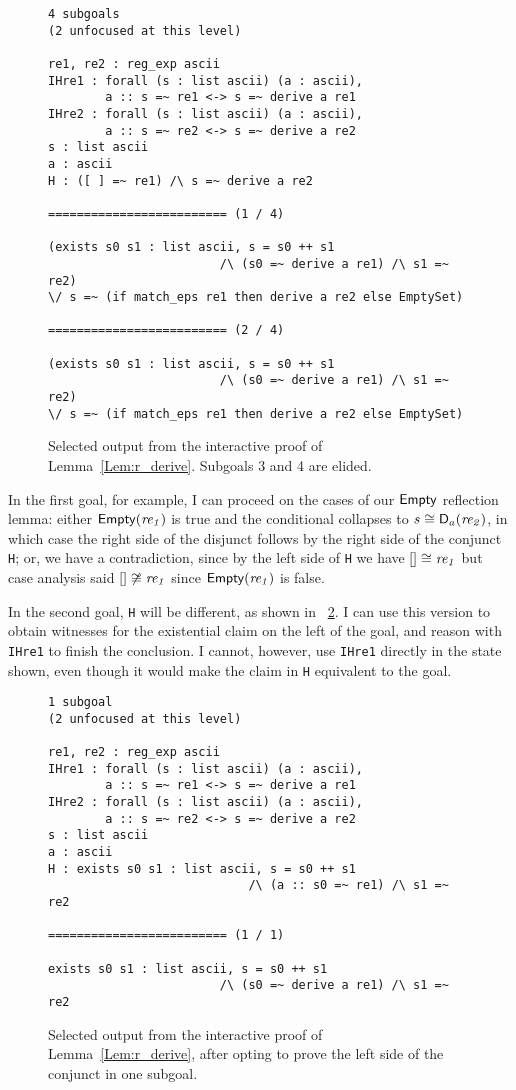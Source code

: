 \begin{figure}
\begin{verbatim}
4 subgoals
(2 unfocused at this level)

re1, re2 : reg_exp ascii
IHre1 : forall (s : list ascii) (a : ascii),
        a :: s =~ re1 <-> s =~ derive a re1
IHre2 : forall (s : list ascii) (a : ascii),
        a :: s =~ re2 <-> s =~ derive a re2
s : list ascii
a : ascii
H : ([ ] =~ re1) /\ s =~ derive a re2

========================= (1 / 4)

(exists s0 s1 : list ascii, s = s0 ++ s1
                        /\ (s0 =~ derive a re1) /\ s1 =~ re2)
\/ s =~ (if match_eps re1 then derive a re2 else EmptySet)

========================= (2 / 4)

(exists s0 s1 : list ascii, s = s0 ++ s1
                        /\ (s0 =~ derive a re1) /\ s1 =~ re2)
\/ s =~ (if match_eps re1 then derive a re2 else EmptySet)
\end{verbatim}
    \caption{Selected output from the interactive proof of
    Lemma~\ref{Lem:r_derive}. Subgoals 3 and 4 are elided.}\label{F:r_derive}
\end{figure}

In the first goal, for example, I can proceed on the cases of our
\(\mathsf{Empty}\) reflection lemma: either \(\mathsf{Empty}(\mathit{re_1})\) is true
and the conditional collapses to \(s \mathrel{\cong} \mathsf{D}_a(\mathit{re_2})\), in which
case the right side of the disjunct follows by the right side of the conjunct
\texttt{H}; or, we have a contradiction, since by the left side of \texttt{H} we have \([]
\mathrel{\cong} \mathit{re_1}\) but case analysis said \([] \not\mathrel{\cong} \mathit{re_1}\)
since \(\mathsf{Empty}(\mathit{re_1})\) is false.

In the second goal, \texttt{H} will be different, as shown in
\figurename~\ref{F:r_derive2}. I can use this version to obtain witnesses for
the existential claim on the left of the goal, and reason with \texttt{IHre1} to
finish the conclusion. I cannot, however, use \texttt{IHre1} directly in the
state shown, even though it would make the claim in \texttt{H} equivalent to the
goal.

\begin{figure}
\begin{verbatim}
1 subgoal
(2 unfocused at this level)

re1, re2 : reg_exp ascii
IHre1 : forall (s : list ascii) (a : ascii),
        a :: s =~ re1 <-> s =~ derive a re1
IHre2 : forall (s : list ascii) (a : ascii),
        a :: s =~ re2 <-> s =~ derive a re2
s : list ascii
a : ascii
H : exists s0 s1 : list ascii, s = s0 ++ s1
                            /\ (a :: s0 =~ re1) /\ s1 =~ re2

========================= (1 / 1)

exists s0 s1 : list ascii, s = s0 ++ s1
                        /\ (s0 =~ derive a re1) /\ s1 =~ re2
\end{verbatim}
\caption{Selected output from the interactive proof of Lemma~\ref{Lem:r_derive},
    after opting to prove the left side of the conjunct in one
    subgoal.}\label{F:r_derive2}
\end{figure}

